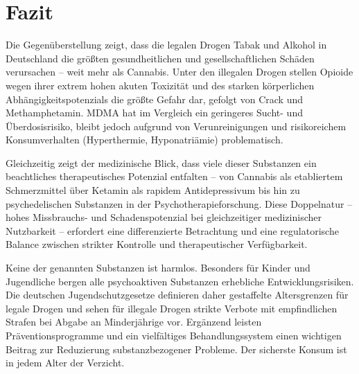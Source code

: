 \documentclass[11pt,a4paper]{article}
\begin{document}
	\section{Fazit}
	
	Die Gegenüberstellung zeigt, dass die legalen Drogen Tabak und Alkohol in Deutschland die größten gesundheitlichen und gesellschaftlichen Schäden verursachen – weit mehr als Cannabis. Unter den illegalen Drogen stellen Opioide wegen ihrer extrem hohen akuten Toxizität und des starken körperlichen Abhängigkeitspotenzials die größte Gefahr dar, gefolgt von Crack und Methamphetamin. MDMA hat im Vergleich ein geringeres Sucht- und Überdosisrisiko, bleibt jedoch aufgrund von Verunreinigungen und risikoreichem Konsumverhalten (Hyperthermie, Hyponatriämie) problematisch. 
	
	Gleichzeitig zeigt der medizinische Blick, dass viele dieser Substanzen ein beachtliches therapeutisches Potenzial entfalten – von Cannabis als etabliertem Schmerzmittel über Ketamin als rapidem Antidepressivum bis hin zu psychedelischen Substanzen in der Psychotherapieforschung. Diese Doppelnatur – hohes Missbrauchs- und Schadenspotenzial bei gleichzeitiger medizinischer Nutzbarkeit – erfordert eine differenzierte Betrachtung und eine regulatorische Balance zwischen strikter Kontrolle und therapeutischer Verfügbarkeit.
	
	Keine der genannten Substanzen ist harmlos. Besonders für Kinder und Jugendliche bergen alle psychoaktiven Substanzen erhebliche Entwicklungsrisiken. Die deutschen Jugendschutzgesetze definieren daher gestaffelte Altersgrenzen für legale Drogen und sehen für illegale Drogen strikte Verbote mit empfindlichen Strafen bei Abgabe an Minderjährige vor. Ergänzend leisten Präventionsprogramme und ein vielfältiges Behandlungssystem einen wichtigen Beitrag zur Reduzierung substanzbezogener Probleme. Der sicherste Konsum ist in jedem Alter der Verzicht.
	
\end{document}
